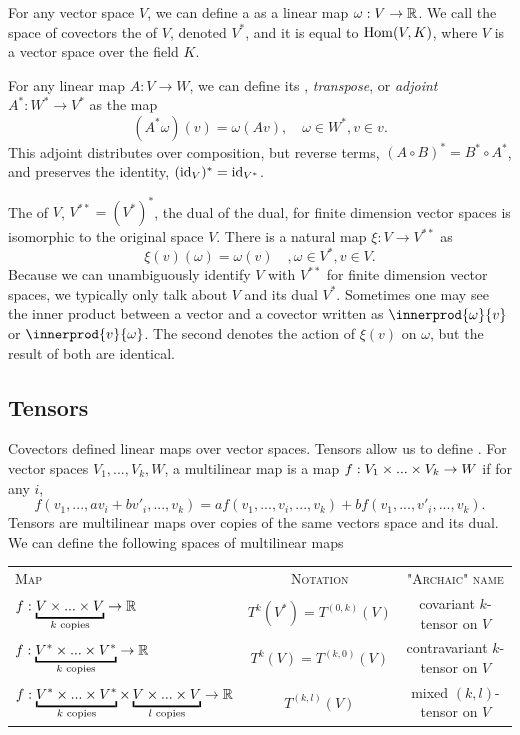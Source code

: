 For any vector space \(V\), we can define a  as a linear map \(\omega: V \to \mathbb{R}\).
We call the space of covectors the  of \(V\), denoted \(V^*\), and it is equal to \(\operatorname{Hom}(V, K)\), where \(V\) is a vector space over the field \(K\).

For any linear map \(A: V\to W\), we can define its , \emph{transpose}, or \emph{adjoint} \(A^*: W^* \to V^*\) as the map \[(A^*\omega)(v) = \omega(Av), \quad \omega \in W^*, v \in v.\]
This adjoint distributes over composition, but reverse terms, \((A\circ B)^* = B^* \circ A^*\), and preserves the identity, \((\operatorname{id}_V)^* = \operatorname{id}_{V^*}\).

The  of \(V\), \(V^{**} = (V^*)^*\), the dual of the dual, for finite dimension vector spaces is isomorphic to the original space \(V\).
There is a natural map \(\xi: V \to V^{**}\) as \[\xi(v)(\omega) = \omega(v) \quad, \omega \in V^*, v \in V.\]
Because we can unambiguously identify \(V\) with \(V^{**}\) for finite dimension vector spaces, we typically only talk about \(V\) and its dual \(V^*\).
Sometimes one may see the inner product between a vector and a covector written as \(\innerprod{\omega}{v}\) or \(\innerprod{v}{\omega}\).
The second denotes the action of \(\xi(v)\) on \(\omega\), but the result of both are identical.

\subsection{Tensors}
\label{sec:tensors}

\label{sec:higher_order_tensors}
Covectors defined linear maps over vector spaces.
Tensors allow us to define .
For vector spaces \(V_1, .
.., V_k, W\), a multilinear map is a map \(f: V_1 \times ... \times V_k \to W\) if for any \(i\), \[f(v_1, ..., a v_i + b v'_i, ..., v_k) = a f(v_1, ..., v_i, ..., v_k) + b f(v_1, ..., v'_i, ..., v_k).\]
Tensors are multilinear maps over copies of the same vectors space and its dual.
We can define the following spaces of multilinear maps 

\begin{tabular}{lcc} \scshape Map                                                                                                  & \scshape Notation           & \scshape "Archaic" name             \\ \(f: \underbracket{V\x .
               .. \x V}_{k \text{ copies}} \to \R \)                                                                               & \(T^k(V^*) = T^{(0,k)}(V)\) & covariant \(k\)-tensor on \(V\)     \\
               \(f: \underbracket{V^* \x ... \x V^*}_{k \text{ copies}} \to \R \)                                                  & \(T^k(V) = T^{(k,0)}(V)\)   & contravariant \(k\)-tensor on \(V\) \\
               \(f: \underbracket{V^*\x ... \x V^*}_{k \text{ copies}}\x \underbracket{V \x ... \x V}_{l \text{ copies}} \to \R \) & \(T^{(k,l)}(V)\)            & mixed \((k,l)\)-tensor on \(V\)     \\
\end{tabular}

